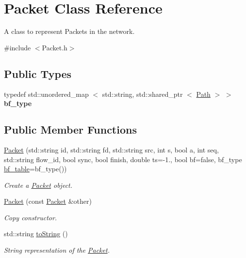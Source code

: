 \hypertarget{classPacket}{\section{\-Packet \-Class \-Reference}
\label{classPacket}
}


\-A class to represent \-Packets in the network.  




{\ttfamily \#include $<$\-Packet.\-h$>$}

\subsection*{\-Public \-Types}
\begin{DoxyCompactItemize}
\item 
\hypertarget{classPacket_a4cae1612a245ea2eadde0066ecc4b990}{typedef std\-::unordered\-\_\-map\*
$<$ std\-::string, std\-::shared\-\_\-ptr\*
$<$ \hyperlink{classPath}{\-Path} $>$ $>$ {\bfseries bf\-\_\-type}}\label{classPacket_a4cae1612a245ea2eadde0066ecc4b990}

\end{DoxyCompactItemize}
\subsection*{\-Public \-Member \-Functions}
\begin{DoxyCompactItemize}
\item 
\hyperlink{classPacket_a0467ca3fb88b9a8a6a41182aed61e5b3}{\-Packet} (std\-::string id, std\-::string fd, std\-::string src, int s, bool a, int seq, std\-::string flow\-\_\-id, bool sync, bool finish, double ts=-\/1., bool bf=false, bf\-\_\-type \hyperlink{classPacket_ad19b836a6a6deab55ec66cb333642a5e}{bf\-\_\-table}=bf\-\_\-type())
\begin{DoxyCompactList}\small\item\em \-Create a \hyperlink{classPacket}{\-Packet} object. \end{DoxyCompactList}\item 
\hyperlink{classPacket_ae8d5dfea51fa7fe55e4705b176f326ec}{\-Packet} (const \hyperlink{classPacket}{\-Packet} \&other)
\begin{DoxyCompactList}\small\item\em \-Copy constructor. \end{DoxyCompactList}\item 
std\-::string \hyperlink{classPacket_aa4f4ad4075cad5a29af1646c3e289399}{to\-String} ()
\begin{DoxyCompactList}\small\item\em \-String representation of the \hyperlink{classPacket}{\-Packet}. \end{DoxyCompactList}\end{DoxyCompactItemize}
